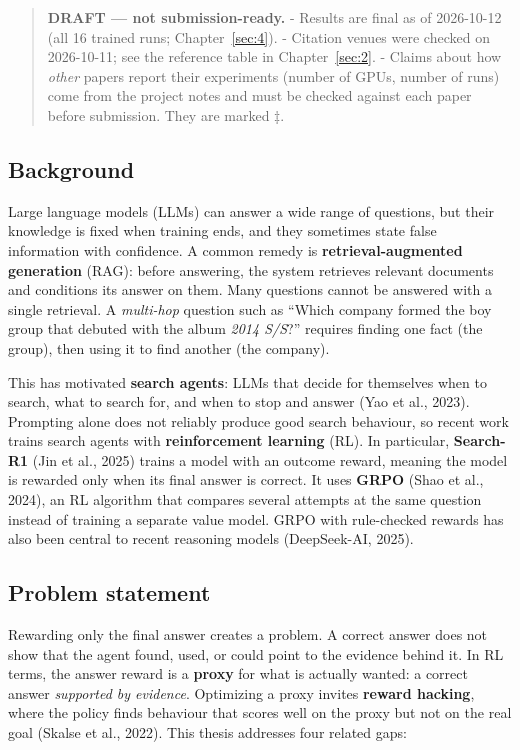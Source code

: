 
\begin{quote}
\textbf{DRAFT --- not submission-ready.} - Results are final as of
2026-10-12 (all 16 trained runs; Chapter~\ref{sec:4}). - Citation venues
were checked on 2026-10-11; see the reference table in
Chapter~\ref{sec:2}. - Claims about how \emph{other} papers report their
experiments (number of GPUs, number of runs) come from the project notes
and must be checked against each paper before submission. They are
marked ‡.
\end{quote}

\subsection{Background}\label{sec:1.1}

Large language models (LLMs) can answer a wide range of questions, but
their knowledge is fixed when training ends, and they sometimes state
false information with confidence. A common remedy is
\textbf{retrieval-augmented generation} (RAG): before answering, the
system retrieves relevant documents and conditions its answer on them.
Many questions cannot be answered with a single retrieval. A
\emph{multi-hop} question such as ``Which company formed the boy group
that debuted with the album \emph{2014 S/S}?'' requires finding one fact
(the group), then using it to find another (the company).

This has motivated \textbf{search agents}: LLMs that decide for
themselves when to search, what to search for, and when to stop and
answer (Yao et al., 2023). Prompting alone does not reliably produce
good search behaviour, so recent work trains search agents with
\textbf{reinforcement learning} (RL). In particular, \textbf{Search-R1}
(Jin et al., 2025) trains a model with an outcome reward, meaning the
model is rewarded only when its final answer is correct. It uses
\textbf{GRPO} (Shao et al., 2024), an RL algorithm that compares several
attempts at the same question instead of training a separate value
model. GRPO with rule-checked rewards has also been central to recent
reasoning models (DeepSeek-AI, 2025).

\subsection{Problem statement}\label{sec:1.2}

Rewarding only the final answer creates a problem. A correct answer does
not show that the agent found, used, or could point to the evidence
behind it. In RL terms, the answer reward is a \textbf{proxy} for what
is actually wanted: a correct answer \emph{supported by evidence}.
Optimizing a proxy invites \textbf{reward hacking}, where the policy
finds behaviour that scores well on the proxy but not on the real goal
(Skalse et al., 2022). This thesis addresses four related gaps:


